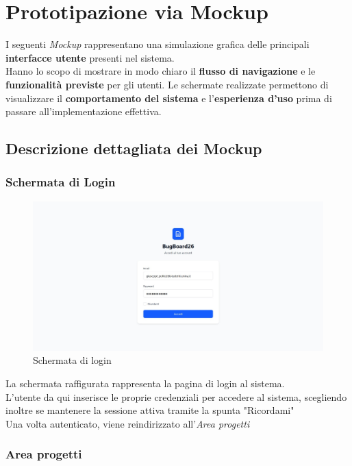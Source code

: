 \chapter{Prototipazione via Mockup}
I seguenti \textit{Mockup} rappresentano una simulazione grafica delle principali \textbf{interfacce utente} presenti nel sistema.\\
Hanno lo scopo di mostrare in modo chiaro il \textbf{flusso di navigazione} e le \textbf{funzionalità previste} per gli utenti. Le schermate realizzate permettono di visualizzare il \textbf{comportamento del sistema} e l'\textbf{esperienza d'uso} prima di passare all'implementazione effettiva.

\section{Descrizione dettagliata dei Mockup}
\subsection{Schermata di Login}

\begin{figure}[h]
	\centering
	\includegraphics[width=1\linewidth]{./Assets/Chapters/mkp1.jpg}
	\caption{Schermata di login}
\end{figure}

La schermata raffigurata rappresenta la pagina di login al sistema.\\
L'utente da qui inserisce le proprie credenziali per accedere al sistema, scegliendo inoltre se mantenere la sessione attiva tramite la spunta "Ricordami"\\
Una volta autenticato, viene reindirizzato all'\textit{Area progetti}

\subsection{Area progetti}

